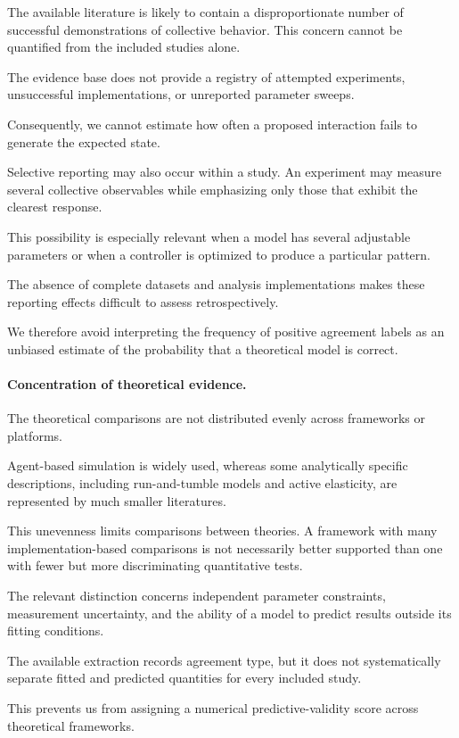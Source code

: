 The available literature is likely
to contain a disproportionate
number of successful demonstrations
of collective behavior.
This concern cannot be
quantified from the
included studies alone.

The evidence base does not
provide a registry of
attempted experiments,
unsuccessful implementations,
or unreported parameter sweeps.

Consequently, we cannot
estimate how often
a proposed interaction
fails to generate
the expected state.

Selective reporting may also
occur within a study.
An experiment may measure
several collective observables
while emphasizing only
those that exhibit
the clearest response.

This possibility is
especially relevant when
a model has several
adjustable parameters
or when a controller
is optimized to produce
a particular pattern.

The absence of complete
datasets and analysis
implementations makes
these reporting effects
difficult to assess
retrospectively.

We therefore avoid
interpreting the
frequency of positive
agreement labels
as an unbiased
estimate of
the probability
that a theoretical
model is correct.

\paragraph*{Concentration of theoretical evidence.}

The theoretical comparisons are not
distributed evenly across
frameworks or platforms.

Agent-based simulation is
widely used, whereas
some analytically
specific descriptions,
including run-and-tumble
models and active elasticity,
are represented by
much smaller literatures.

This unevenness limits
comparisons between
theories.
A framework with
many implementation-based
comparisons is not
necessarily better supported
than one with fewer
but more discriminating
quantitative tests.

The relevant distinction
concerns independent parameter
constraints, measurement
uncertainty, and the
ability of a model
to predict results
outside its fitting
conditions.

The available extraction
records agreement type,
but it does not
systematically separate
fitted and predicted
quantities for every
included study.

This prevents us
from assigning
a numerical
predictive-validity
score across
theoretical frameworks.


